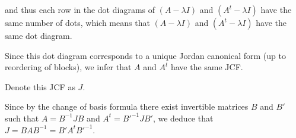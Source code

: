 \documentclass[11pt]{scrartcl}
\begin{document}
\begin{soln}
  and thus each row in the dot diagrams of $(A-\lambda I)$ and
  $(A^t-\lambda I)$ have the same number of dots, which means that
  $(A-\lambda I)$ and $(A^t-\lambda I)$ have the same dot diagram.

  Since this dot diagram corresponds to a unique Jordan canonical form
  (up to reordering of blocks), we infer that $A$ and $A^t$
  have the same JCF. 

  Denote this JCF as $J$.

  Since by the change of basis formula there exist invertible matrices
  $B$ and $B'$ such that $A = B^{-1}JB $ and $A^t = B'^{-1}JB'$, we
  deduce that $J = BAB^{-1} = B'A^tB'^{-1}$. 



  
















\end{soln}
\end{document}
